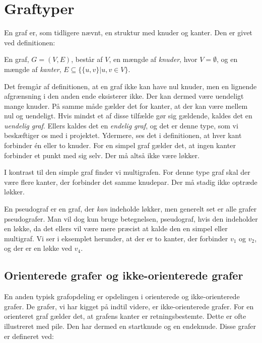 \section{Graftyper}
En graf er, som tidligere nævnt, en struktur med knuder og kanter. Den er givet ved definitionen:
\begin{defn}
En graf, $G=(V,E)$, består af $V$, en mængde af \emph{knuder}, hvor $V = \emptyset$, og en mængde af \emph{kanter}, $E \subseteq \{\{u,v\}|u,v \in V\}$.
\end{defn}
Det fremgår af definitionen, at en graf ikke kan have nul knuder, men en lignende afgrænsning i den anden ende eksisterer ikke. Der kan dermed være uendeligt mange knuder. På samme måde gælder det for kanter, at der kan være mellem nul og uendeligt. Hvis mindst et af disse tilfælde gør sig gældende, kaldes det en \emph{uendelig graf}. Ellers kaldes det en \emph{endelig graf}, og det er denne type, som vi beskæftiger os med i projektet.
Ydermere, ses det i definitionen, at hver kant forbinder én eller to knuder. For en simpel graf gælder det, at ingen kanter forbinder et punkt med sig selv. Der må altså ikke være løkker. 



I kontrast til den simple graf finder vi multigrafen. For denne type graf skal der være flere kanter, der forbinder det samme knudepar. Der må stadig ikke optræde løkker.



En pseudograf er en graf, der \emph{kan} indeholde løkker, men generelt set er alle grafer pseudografer. Man vil dog kun bruge betegnelsen, pseudograf, hvis den indeholder en løkke, da det ellers vil være mere præcist at kalde den en simpel eller multigraf. Vi ser i eksemplet herunder, at der er to kanter, der forbinder $v_{1}$ og $v_{2}$, og der er en løkke ved $v_{4}$.




\subsection{Orienterede grafer og ikke-orienterede grafer}
En anden typisk grafopdeling er opdelingen i orienterede og ikke-orienterede grafer. De grafer, vi har kigget på indtil videre, er ikke-orienterede grafer. For en orienteret graf gælder det, at grafens kanter er retningsbestemte. Dette er ofte illustreret med pile. Den har dermed en startknude og en endeknude. Disse grafer er defineret ved:


